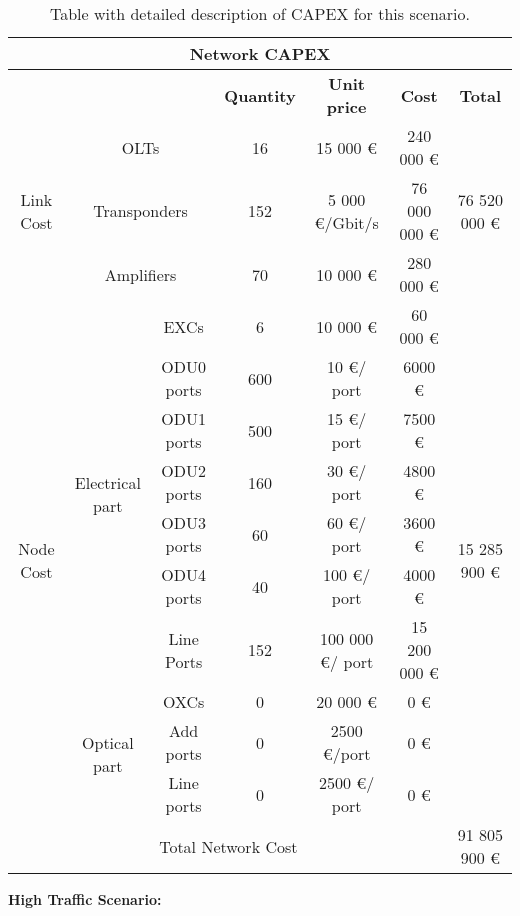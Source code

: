 \begin{table}[H]
	\centering
	\begin{tabular}{| c | c | c | c | c | c | c |}
		\hline
		\multicolumn{7}{|c|}{\textbf{Network CAPEX}} \\ \hline
		\multicolumn{3}{|c|}{} & \textbf{Quantity} & \textbf{Unit price} & \textbf{Cost} & \textbf{Total} \\ \hline
		\multirow{3}{*}{Link Cost} & \multicolumn{2}{c|}{OLTs} & 16 & 15 000 \euro & 240 000 \euro & \multirow{3}{*}{76 520 000 \euro} \\ \cline{2-6}
		& \multicolumn{2}{c|}{Transponders} & 152 & 5 000 \euro /Gbit/s & 76 000 000 \euro &  \\ \cline{2-6}
		& \multicolumn{2}{c|}{Amplifiers} & 70 & 10 000 \euro & 280 000 \euro &  \\ \hline
		\multirow{10}{*}{Node Cost} & \multirow{7}{*}{Electrical part} & EXCs & 6 & 10 000 \euro & 60 000 \euro & \multirow{10}{*}{15 285 900 \euro} \\ \cline{3-6}
		&  & ODU0 ports & 600 & 10 \euro/ port & 6000 \euro &  \\ \cline{3-6}
		&  & ODU1 ports & 500 & 15 \euro/ port & 7500 \euro &  \\ \cline{3-6}
		&  & ODU2 ports & 160 & 30 \euro/ port & 4800 \euro &  \\ \cline{3-6}
		&  & ODU3 ports & 60 & 60 \euro/ port & 3600 \euro &  \\ \cline{3-6}
		&  & ODU4 ports & 40 & 100 \euro/ port & 4000 \euro &  \\ \cline{3-6}
		&  & Line Ports & 152 & 100 000 \euro/ port & 15 200 000 \euro &  \\ \cline{2-6}
		& \multirow{3}{*}{Optical part} & OXCs & 0 & 20 000 \euro & 0 \euro &  \\ \cline{3-6}
		&  & Add ports & 0 & 2500 \euro/port & 0 \euro &  \\ \cline{3-6}
		&  & Line ports & 0 & 2500 \euro/ port & 0 \euro &  \\ \hline
		\multicolumn{6}{|c|}{Total Network Cost} & 91 805 900 \euro \\ \hline
	\end{tabular}
	\caption{Table with detailed description of CAPEX for this scenario.}
	\label{capex}
\end{table}

\textbf{High Traffic Scenario:}


